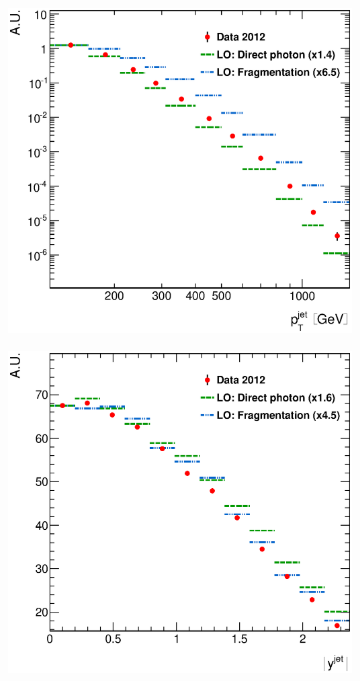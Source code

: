 \documentclass[12pt, twoside]{article}
\numberwithin{equation}{section}
\numberwithin{figure}{section}
\newenvironment{changemargin}[2]{%
\begin{list}{}{%
\setlength{\topsep}{0pt}%
\setlength{\leftmargin}{#1}%
\setlength{\rightmargin}{#2}%
\setlength{\listparindent}{\parindent}%
\setlength{\itemindent}{\parindent}%
\setlength{\parsep}{\parskip}%
}%
\item[]}{\end{list}}
\begin{document}
\begin{figure}
\begin{changemargin}{-1.0cm}{-0.75cm}
\begin{changemargin}{-0.75cm}{-1.0cm}
        \vspace{0.2cm}
        \begin{subfigure}[b]{0.37\textwidth}
            \includegraphics[width=\textwidth]{./images/DifferentialCrossSectionsDPFP/NORM_DIFF_CRSS_SEC-104.eps}
            \subcaption{}
            \label{fig:DiffCrossSectDPFPPtJet}
        \end{subfigure}
        \begin{subfigure}[b]{0.37\textwidth}
            \includegraphics[width=\textwidth]{./images/DifferentialCrossSectionsDPFP/NORM_DIFF_CRSS_SEC-105.eps}

\end{subfigure}
\end{changemargin}
\end{changemargin}
\end{figure}
\end{document}
